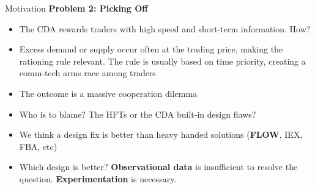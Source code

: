 \documentclass[10pt]{beamer}
\begin{document}
\begin{frame}{Motivation}
    \textbf{Problem 2: Picking Off} 
    \begin{itemize}
        \item The CDA rewards traders with high speed and short-term information. How?
        \item Excess demand or supply occur often at the trading price, making the rationing rule relevant. The rule is usually based on time priority, creating a comm-tech arms race among traders
        \item The outcome is a massive cooperation dilemma %
        \item Who is to blame? The HFTs or the CDA built-in design flaws?
        \item We think a design fix is better than heavy handed solutions (\textbf{FLOW}, IEX, FBA, etc)
        \item Which design is better? \textbf{Observational data} is insufficient to resolve the question. \textbf{Experimentation} is necessary. 
    \end{itemize}
\end{frame}
\end{document}
